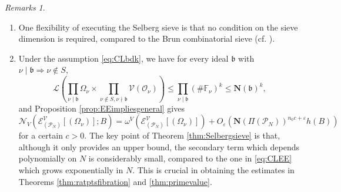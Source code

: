 \documentclass[11pt,letterpaper]{amsart}
\newcommand{\BF}{{\mathbb {F}}}
\newcommand{\CE}{{\mathcal {E}}}
\newcommand{\CL}{{\mathcal {L}}}
\newcommand{\CN}{{\mathcal {N}}}
\newcommand{\CO}{{\mathcal {O}}}
\newcommand{\CP}{{\mathcal {P}}}
\newcommand{\CV}{{\mathcal {V}}}
\theoremstyle{plain}
\numberwithin{equation}{section}
\theoremstyle{definition}
\theoremstyle{remark}
\newtheorem{remarks}[theorem]{Remarks}
\begin{document}
\begin{remarks}
	\hfill
	\begin{enumerate}
		\item One flexibility of executing the Selberg sieve is that no condition on the sieve dimension is required, compared to the Brun combinatorial sieve (cf. \cite[Fundamental Lemma 6.3, Condition (6.47)]{I-K}).
		\item 	Under the assumption \eqref{eq:CLbdk}, we have for every ideal $\mathfrak{b}$ with $\nu\mid\mathfrak{b}\Rightarrow\nu\notin S$, 
		\begin{equation}\label{eq:bdCL}
			\CL\left(\prod_{\nu\mid \mathfrak{b}}\Omega_\nu\times \prod_{\nu\notin S,\nu\nmid\mathfrak{b}}\CV(\CO_\nu)\right)\leqslant \prod_{\nu\mid\mathfrak{b}}(\#\BF_\nu)^k\leqslant \mathbf{N}(\mathfrak{b})^k,
		\end{equation} and Proposition \ref{prop:EEimpliesgeneral} gives
		\begin{equation}\label{eq:CLEE}
			\CN_V(\CE^{\CV}_{(\CP_N)}[(\Omega_\nu)];B)=\omega^V(\CE^{\CV}_{(\CP_N)}[(\Omega_\nu)])+O_\varepsilon\left(\mathbf{N}(\Pi(\CP_N))^{n_0c+\varepsilon}h(B)\right)
		\end{equation} for a certain $c>0$.
		The key point of Theorem \ref{thm:Selbergsieve} is that, although it only provides an upper bound, the secondary term which depends polynomially on $N$ is considerably small, compared to the one in \eqref{eq:CLEE} which grows exponentially in $N$. This is crucial in obtaining the estimates in Theorems \ref{thm:ratptsfibration} and \ref{thm:primevalue}.
	\end{enumerate}
\end{remarks}
\end{document}
